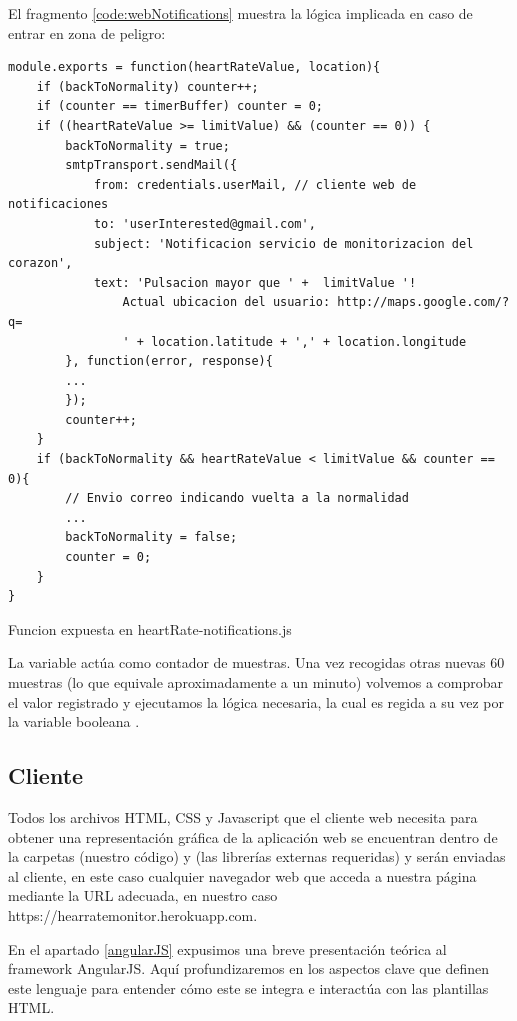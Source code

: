 El fragmento \ref{code:webNotifications} muestra la lógica implicada en caso de entrar en zona de peligro:

\begin{listing}[h] 
\begin{verbatim}
module.exports = function(heartRateValue, location){
    if (backToNormality) counter++;
    if (counter == timerBuffer) counter = 0;	
    if ((heartRateValue >= limitValue) && (counter == 0)) {
        backToNormality = true;
        smtpTransport.sendMail({
            from: credentials.userMail, // cliente web de notificaciones
            to: 'userInterested@gmail.com',
            subject: 'Notificacion servicio de monitorizacion del corazon',
            text: 'Pulsacion mayor que ' +  limitValue '!
                Actual ubicacion del usuario: http://maps.google.com/?q=
                ' + location.latitude + ',' + location.longitude
        }, function(error, response){
        ...    
        });
        counter++;
    }
    if (backToNormality && heartRateValue < limitValue && counter == 0){
        // Envio correo indicando vuelta a la normalidad
        ...
        backToNormality = false;
        counter = 0;
    }	
}
\end{verbatim}
\caption{Funcion expuesta en heartRate-notifications.js}
\label{code:webNotifications}
\end{listing}

La variable  actúa como contador de muestras. Una vez recogidas otras nuevas 60 muestras (lo que equivale aproximadamente a un minuto) volvemos a comprobar el valor registrado y ejecutamos la lógica necesaria, la cual es regida a su vez por la variable booleana .

\subsection{Cliente}
\label{Cliente}
Todos los archivos HTML, CSS y Javascript que el cliente web necesita para obtener una representación gráfica de la aplicación web se encuentran dentro de la carpetas  (nuestro código) y  (las librerías externas requeridas) y serán enviadas al cliente, en este caso cualquier navegador web que acceda a nuestra página mediante la \ac{URL} adecuada, en nuestro caso https://hearratemonitor.herokuapp.com.

En el apartado \ref{angularJS} expusimos una breve presentación teórica al framework AngularJS. Aquí profundizaremos en los aspectos clave que definen este lenguaje para entender cómo este se integra e interactúa con las plantillas HTML.

